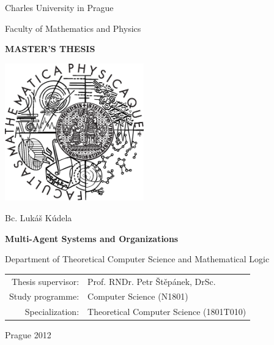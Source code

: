 \begin{titlepage}
\begin{center}

\large
Charles University in Prague

\medskip

Faculty of Mathematics and Physics

\vfill

{\Large \textbf{MASTER'S THESIS}}

\vfill

\includegraphics[width=60mm]{images/mff_logo.eps}

\vfill
\vspace{5mm}

{\LARGE Bc. Lukáš Kúdela}

\vspace{15mm}

{\LARGE \textbf{Multi-Agent Systems and Organizations}}

\vfill

Department of Theoretical Computer Science and Mathematical Logic

\vfill

\begin{tabular}{rl}
Thesis supervisor: & Prof. RNDr. Petr Štěpánek, DrSc.\\
\noalign{\vspace{2mm}}
Study programme: & Computer Science (N1801)\\
\noalign{\vspace{2mm}}
Specialization: & Theoretical Computer Science (1801T010)\\
\end{tabular}

\vfill

Prague 2012

\end{center}
\end{titlepage}